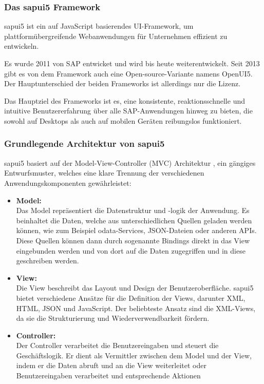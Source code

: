 \subsubsection[Das \gls{sapui5} Framework]{Das \gls{sapui5} Framework}
\gls{sapui5} ist ein auf JavaScript basierendes UI-Framework, um plattformübergreifende Webanwendungen für Unternehmen effizient zu entwickeln.

Es wurde 2011 von SAP entwicket und wird bis heute weiterentwickelt. Seit 2013 gibt es von dem Framework auch eine Open-source-Variante namens OpenUI5. Der Hauptunterschied der beiden Frameworks ist allerdings nur die Lizenz.

Das Hauptziel des Frameworks ist es, eine konsistente, reaktionsschnelle und intuitive Benutzererfahrung über alle SAP-Anwendungen hinweg zu bieten, die sowohl auf Desktops als auch auf mobilen Geräten reibungslos funktioniert.

\subsubsection[Grundlegende Architektur von \gls{sapui5}]{Grundlegende Architektur von \gls{sapui5}}
\gls{sapui5} basiert auf der Model-View-Controller (MVC) Architektur \cite{ui5_mvc}, ein gängiges Entwurfsmuster, welches eine klare Trennung der verschiedenen Anwendungskomponenten gewährleistet:
\begin{itemize}
    \item \textbf{Model:} \\
    Das Model repräsentiert die Datenstruktur und -logik der Anwendung. Es beinhaltet die Daten, welche aus unterschiedlichen Quellen geladen werden können, wie zum Beispiel \gls{odata}-Services, JSON-Dateien oder anderen APIs.
    Diese Quellen können dann durch sogenannte Bindings direkt in das View eingebunden werden und von dort auf die Daten zugegriffen und in diese geschreiben werden.
    \item \textbf{View:} \\
    Die View beschreibt das Layout und Design der Benutzeroberfläche. \gls{sapui5} bietet verschiedene Ansätze für die Definition der Views, darunter XML, HTML, JSON und JavaScript.
    Der beliebteste Ansatz sind die XML-Views, da sie die Strukturierung und Wiederverwendbarkeit fördern.
    \newpage
    \item \textbf{Controller:} \\
    Der Controller verarbeitet die Benutzereingaben und steuert die Geschäftslogik.
    Er dient als Vermittler zwischen dem Model und der View, indem er die Daten abruft und an die View weiterleitet oder Benutzereingaben verarbeitet und entsprechende Aktionen 
\end{itemize}

